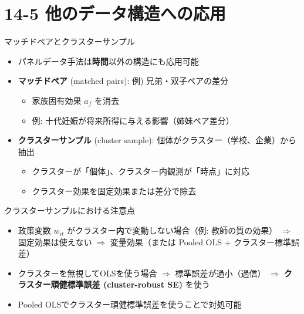 \documentclass[
  ignorenonframetext,
]{beamer}
\providecommand{\tightlist}{%
  \setlength{\itemsep}{0pt}\setlength{\parskip}{0pt}}
\begin{document}
\section{14-5
他のデータ構造への応用}\label{ux4ed6ux306eux30c7ux30fcux30bfux69cbux9020ux3078ux306eux5fdcux7528}

\begin{frame}{マッチドペアとクラスターサンプル}
\label{ux30deux30c3ux30c1ux30c9ux30daux30a2ux3068ux30afux30e9ux30b9ux30bfux30fcux30b5ux30f3ux30d7ux30eb}
\begin{itemize}
\tightlist
\item
  パネルデータ手法は\textbf{時間}以外の構造にも応用可能
\item
  \textbf{マッチドペア} (matched pairs): 例) 兄弟・双子ペアの差分

  \begin{itemize}
  \tightlist
  \item
    家族固有効果 \(a_f\) を消去
  \item
    例: 十代妊娠が将来所得に与える影響（姉妹ペア差分）
  \end{itemize}
\item
  \textbf{クラスターサンプル} (cluster sample):
  個体がクラスター（学校、企業）から抽出

  \begin{itemize}
  \tightlist
  \item
    クラスターが「個体」、クラスター内観測が「時点」に対応
  \item
    クラスター効果を固定効果または差分で除去
  \end{itemize}
\end{itemize}
\end{frame}

\begin{frame}{クラスターサンプルにおける注意点}
\label{ux30afux30e9ux30b9ux30bfux30fcux30b5ux30f3ux30d7ux30ebux306bux304aux3051ux308bux6ce8ux610fux70b9}
\begin{itemize}
\tightlist
\item
  政策変数 \(w_{it}\) がクラスター\textbf{内}で変動しない場合（例:
  教師の質の効果） \(\Rightarrow\) 固定効果は使えない \(\Rightarrow\)
  変量効果（または Pooled OLS + クラスター標準誤差）
\item
  クラスターを無視してOLSを使う場合 \(\Rightarrow\)
  標準誤差が過小（過信） \(\Rightarrow\) \textbf{クラスター頑健標準誤差
  (cluster-robust SE)} を使う
\item
  Pooled OLSでクラスター頑健標準誤差を使うことで対処可能
\end{itemize}
\end{frame}
\end{document}
